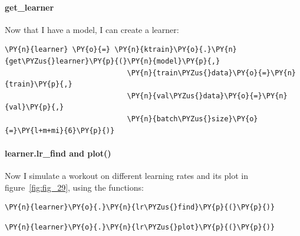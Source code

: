 \paragraph{get\_learner}
Now that I have a model, I can create a learner:
    \begin{tcolorbox}[breakable, size=fbox, boxrule=1pt, pad at break*=1mm,colback=cellbackground, colframe=cellborder]
\begin{Verbatim}[commandchars=\\\{\},fontsize=\footnotesize]
\PY{n}{learner} \PY{o}{=} \PY{n}{ktrain}\PY{o}{.}\PY{n}{get\PYZus{}learner}\PY{p}{(}\PY{n}{model}\PY{p}{,}
                             \PY{n}{train\PYZus{}data}\PY{o}{=}\PY{n}{train}\PY{p}{,} 
                             \PY{n}{val\PYZus{}data}\PY{o}{=}\PY{n}{val}\PY{p}{,} 
                             \PY{n}{batch\PYZus{}size}\PY{o}{=}\PY{l+m+mi}{6}\PY{p}{)}
\end{Verbatim}
\end{tcolorbox}

\paragraph{learner.lr\_find and plot()}
Now I simulate a workout on different learning rates and its plot in figure~\ref{fig:fig_29}, using the functions:
    \begin{tcolorbox}[breakable, size=fbox, boxrule=1pt, pad at break*=1mm,colback=cellbackground, colframe=cellborder]
\begin{Verbatim}[commandchars=\\\{\},fontsize=\footnotesize]
\PY{n}{learner}\PY{o}{.}\PY{n}{lr\PYZus{}find}\PY{p}{(}\PY{p}{)}
\end{Verbatim}
\end{tcolorbox}

\begin{tcolorbox}[breakable, size=fbox, boxrule=1pt, pad at break*=1mm,colback=cellbackground, colframe=cellborder]
\begin{Verbatim}[commandchars=\\\{\},fontsize=\footnotesize]
\PY{n}{learner}\PY{o}{.}\PY{n}{lr\PYZus{}plot}\PY{p}{(}\PY{p}{)}
\end{Verbatim}
\end{tcolorbox}

